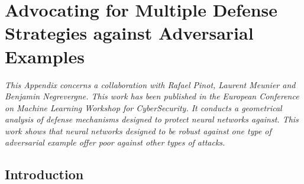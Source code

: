 \chapter{Advocating for Multiple Defense Strategies against Adversarial Examples}
\label{appendix:ap4-advocating_multiple_defense_strategies_against_adversarial_examples}
\localtoc


\vspace{\fill}

\emph{
This Appendix concerns a collaboration with Rafael Pinot, Laurent Meunier and Benjamin Negrevergne.
This work has been published in the European Conference on Machine Learning Workshop for CyberSecurity.
It conducts a geometrical analysis of defense mechanisms designed to protect neural networks against.
This work shows that neural networks designed to be robust against one type of adversarial example offer poor against other types of attacks.
}

\vspace{\fill}


\section{Introduction}
\label{section:ap4-introduction}





